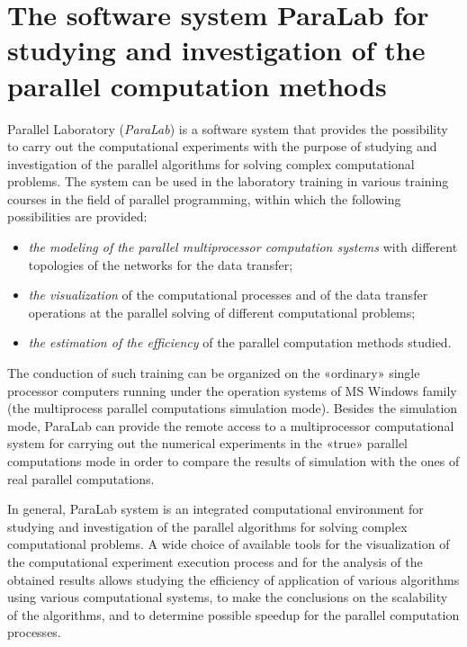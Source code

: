 \section{The software system ParaLab for studying and investigation of the parallel computation methods}

Parallel Laboratory (\textit{ParaLab}) is a software system that provides the possibility to carry out the computational experiments with the purpose of studying and investigation of the parallel algorithms for solving complex computational problems. The system can be used in the laboratory training in various training courses in the field of parallel programming, within which the following possibilities are provided:

\begin{itemize}
\item \textit{the modeling of the parallel multiprocessor computation systems} with different topologies of the networks for the data transfer; 

\item \textit{the visualization} of the computational processes and of the data transfer operations at the parallel solving of different computational problems; 

\item \textit{the estimation of the efficiency} of the parallel computation methods studied.
\end{itemize}

The conduction of such training can be organized on the «ordinary» single processor computers running under the operation systems of MS Windows family (the multiprocess parallel computations simulation mode). Besides the simulation mode, ParaLab can provide the remote access to a multiprocessor computational system for carrying out the numerical experiments in the «true» parallel computations mode in order to compare the results of simulation with the ones of real parallel computations.

In general, ParaLab system is an integrated computational environment for studying and investigation of the parallel algorithms for solving complex computational problems. A wide choice of available tools for the visualization of the computational experiment execution process and for the analysis of the obtained results allows studying the efficiency of application of various algorithms using various computational systems, to make the conclusions on the scalability of the algorithms, and to determine possible speedup for the parallel computation processes.

